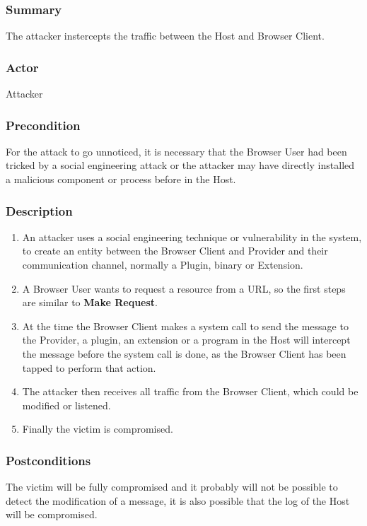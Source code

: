 \documentclass{sig-alternate-05-2015}
\begin{document}
  
  \subsubsection*{Summary} The attacker instercepts the traffic between the Host and Browser Client.
  \subsubsection*{Actor} Attacker
  \subsubsection*{Precondition} For the attack to go unnoticed, it is necessary that the Browser User had been tricked by a social engineering attack or the attacker may have directly installed a malicious component or process before in the Host.

  \subsubsection*{Description}
      \begin{enumerate}
        \item An attacker uses a social engineering technique or vulnerability in the system, to create an entity between the Browser Client and Provider and their communication channel, normally a Plugin, binary or Extension.
        \item A Browser User wants to request a resource from a URL, so the first steps are similar to \textbf{Make Request}.
        \item At the time the Browser Client makes a system call to send the message to the Provider, a plugin, an extension or a program in the Host will intercept the message before the system call is done, as the Browser Client has been tapped to perform that action.
        \item The attacker then receives all traffic from the Browser Client, which could be modified or listened.
        \item Finally the victim is compromised.
      \end{enumerate}
  \subsubsection*{Postconditions} The victim will be fully compromised and it probably will not be possible to detect the modification of a message, it is also possible that the log of the Host will be compromised.
\end{document}
